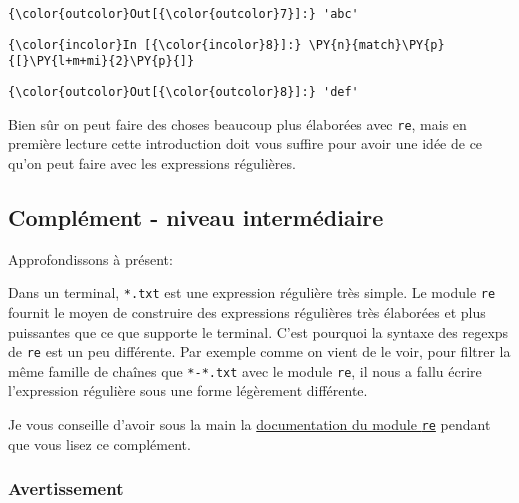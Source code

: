 \begin{Verbatim}[commandchars=\\\{\},frame=single,framerule=0.3mm,rulecolor=\color{cellframecolor}]
{\color{outcolor}Out[{\color{outcolor}7}]:} 'abc'
\end{Verbatim}
            
    \begin{Verbatim}[commandchars=\\\{\},frame=single,framerule=0.3mm,rulecolor=\color{cellframecolor}]
{\color{incolor}In [{\color{incolor}8}]:} \PY{n}{match}\PY{p}{[}\PY{l+m+mi}{2}\PY{p}{]}
\end{Verbatim}


\begin{Verbatim}[commandchars=\\\{\},frame=single,framerule=0.3mm,rulecolor=\color{cellframecolor}]
{\color{outcolor}Out[{\color{outcolor}8}]:} 'def'
\end{Verbatim}
            
    Bien sûr on peut faire des choses beaucoup plus élaborées avec
\texttt{re}, mais en première lecture cette introduction doit vous
suffire pour avoir une idée de ce qu'on peut faire avec les expressions
régulières.

    \hypertarget{compluxe9ment---niveau-intermuxe9diaire}{%
\subsection{Complément - niveau
intermédiaire}\label{compluxe9ment---niveau-intermuxe9diaire}}

    Approfondissons à présent:

    Dans un terminal, \texttt{*.txt} est une expression régulière très
simple. Le module \texttt{re} fournit le moyen de construire des
expressions régulières très élaborées et plus puissantes que ce que
supporte le terminal. C'est pourquoi la syntaxe des regexps de
\texttt{re} est un peu différente. Par exemple comme on vient de le
voir, pour filtrer la même famille de chaînes que \texttt{*-*.txt} avec
le module \texttt{re}, il nous a fallu écrire l'expression régulière
sous une forme légèrement différente.

    Je vous conseille d'avoir sous la main la
\href{https://docs.python.org/3/library/re.html}{documentation du module
\texttt{re}} pendant que vous lisez ce complément.

    \hypertarget{avertissement}{%
\subsubsection{Avertissement}\label{avertissement}}

